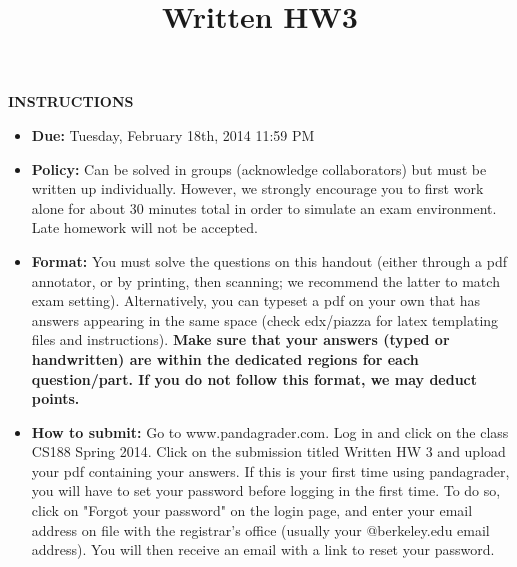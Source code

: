 \documentclass[twoside]{article}
\title{Written HW3}
\begin{document}
\thispagestyle{empty}
\maketitle


\smallskip
\smallskip
\textbf{INSTRUCTIONS}

\begin{itemize}
\item \textbf{Due:} Tuesday, February 18th, 2014 11:59 PM
\item \textbf{Policy:} Can be solved in groups (acknowledge collaborators) but must
be written up individually. However,
we strongly encourage you to first work alone for about 30 minutes total in order to simulate an exam environment.  Late homework
will not be accepted.
\item \textbf{Format:}
You must solve the questions on this handout (either through a pdf annotator, or by printing, then scanning; we recommend the latter to match exam setting). Alternatively, you can typeset a pdf on your own that has answers appearing in the same space (check edx/piazza for latex templating files and instructions).
\textbf{Make sure that your answers (typed or handwritten) are within the
dedicated regions for each question/part.  If you do not follow this format, we may deduct points.}

\item \textbf{How to submit:}  Go to www.pandagrader.com. Log in and click on the
class CS188 Spring 2014. Click
on the submission titled Written HW 3 and upload your pdf containing your answers. If this is your first time using
pandagrader, you will have to set your password before logging in the
first time.  To do so, click on "Forgot your password" on the login
page, and enter your email address on file with the registrar's office
(usually your @berkeley.edu email address). You will then receive an
email with a link to reset your password.

\end{itemize}
\end{document}
